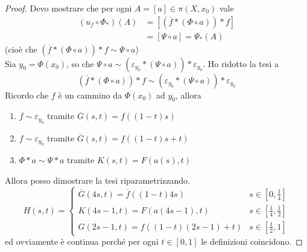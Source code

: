 \begin{proof} Devo mostrare che per ogni $A=[a]\in\pi(X,x_0)$ vale 
	\begin{align*}
	(u_f\circ \Phi_*)(A) &= [(\overline{f}*(\Phi\circ a))*f] \\
	&=[\Psi\circ a]=\Psi_*(A)
	\end{align*}
	(cioè che $(\overline{f}*(\Phi\circ a))*f \sim \Psi\circ a$) \\ 
	Sia $y_0=\Phi(x_0)$, so che $\Psi\circ a \sim (\varepsilon_{y_0}*(\Psi \circ a))*\varepsilon_{y_0}$. Ho ridotto la tesi a 
	\begin{equation*}
	(\overline{f}*(\Phi\circ a))*f\sim (\varepsilon_{y_0}*(\Psi \circ a))*\varepsilon_{y_0}
	\end{equation*}
	Ricordo che $f$ è un cammino da $\Phi(x_0)$ ad $y_0$, allora 
	\begin{enumerate}
		\item $\overline{f}\sim \varepsilon_{y_0}$ tramite $\overline{G}(s,t)=f\left((1-t)s\right)$
		\item $f\sim \varepsilon_{y_0}$ tramite $\overline{G}(s,t)=f\left((1-t)s+t\right)$
		\item $\Phi*a \sim \Psi*a$ tramite $K(s,t)=F\left(a(s),t\right)$
	\end{enumerate}
	Allora posso dimostrare la tesi riparametrizzando.
	\begin{equation*} 
	H(s,t)=
	\begin{cases}
	\overline{G}(4s,t)=\overline{f}\left((1-t)4s\right) & s \in [0,\frac{1}{4}]\\
	K(4s-1,t)=F\left(a(4s-1),t\right) & s \in [\frac{1}{4},\frac{1}{2}]\\
	G(2s-1,t)=f\left((1-t)(2s-1)+t\right) & s \in [\frac{1}{2},1]
	\end{cases}
	\end{equation*}
	ed ovviamente è continua perché per ogni $t \in [0,1]$ le definizioni coincidono.
\end{proof}

